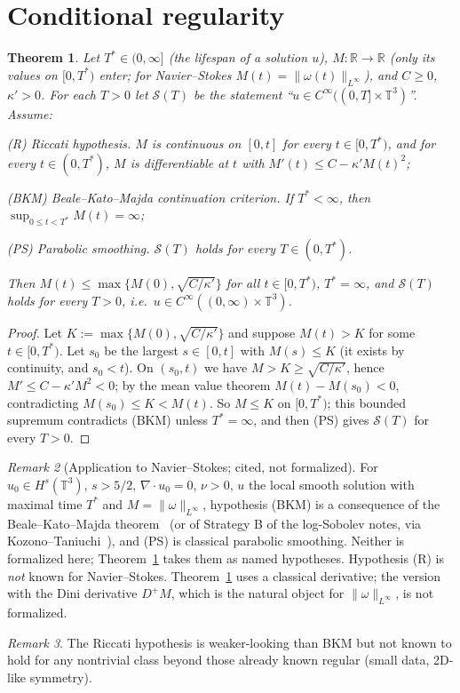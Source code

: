 \documentclass[11pt]{amsart}
\newtheorem{theorem}{Theorem}[section]
\theoremstyle{definition}\newtheorem{definition}[theorem]{Definition}
\theoremstyle{remark}\newtheorem{remark}[theorem]{Remark}
\newcommand{\T}{\mathbb{T}^3}
\begin{document}
\section{Conditional regularity}
\begin{theorem}\label{thm:cond}
Let $T^*\in(0,\infty]$ (the lifespan of a solution $u$), $M\colon\mathbb R\to\mathbb R$ (only its values on $[0,T^*)$ enter; for
Navier--Stokes $M(t)=\|\omega(t)\|_{L^\infty}$), and $C\ge0$, $\kappa'>0$. For each $T>0$ let $\mathcal S(T)$ be the statement
``$u\in C^\infty((0,T]\times\T)$''. Assume:
\par\noindent(R) \emph{Riccati hypothesis.} $M$ is continuous on $[0,t]$ for every $t\in[0,T^*)$, and for every $t\in(0,T^*)$, $M$ is differentiable at $t$ with $M'(t)\le C-\kappa'M(t)^2$;
\par\noindent(BKM) \emph{Beale--Kato--Majda continuation criterion.} If $T^*<\infty$, then $\sup_{0\le t<T^*}M(t)=\infty$;
\par\noindent(PS) \emph{Parabolic smoothing.} $\mathcal S(T)$ holds for every $T\in(0,T^*)$.
\par\noindent
Then $M(t)\le\max\{M(0),\sqrt{C/\kappa'}\}$ for all $t\in[0,T^*)$, $T^*=\infty$, and $\mathcal S(T)$ holds for every $T>0$, i.e.\ $u\in C^\infty((0,\infty)\times\T)$.
\end{theorem}
\begin{proof}Let $K:=\max\{M(0),\sqrt{C/\kappa'}\}$ and suppose $M(t)>K$ for some $t\in[0,T^*)$. Let $s_0$ be the largest
$s\in[0,t]$ with $M(s)\le K$ (it exists by continuity, and $s_0<t$). On $(s_0,t)$ we have $M>K\ge\sqrt{C/\kappa'}$, hence
$M'\le C-\kappa'M^2<0$; by the mean value theorem $M(t)-M(s_0)<0$, contradicting $M(s_0)\le K<M(t)$. So $M\le K$ on $[0,T^*)$;
this bounded supremum contradicts (BKM) unless $T^*=\infty$, and then (PS) gives $\mathcal S(T)$ for every $T>0$.\end{proof}
\begin{remark}[Application to Navier--Stokes; cited, not formalized]
For $u_0\in H^s(\T)$, $s>5/2$, $\nabla\cdot u_0=0$, $\nu>0$, $u$ the local smooth solution with maximal time $T^*$ and
$M=\|\omega\|_{L^\infty}$, hypothesis (BKM) is a consequence of the Beale--Kato--Majda theorem~\cite{BKM1984} (or of Strategy B of the
log-Sobolev notes, via Kozono--Taniuchi~\cite{KozonoTaniuchi}), and (PS) is classical parabolic smoothing. Neither is formalized here;
Theorem~\ref{thm:cond} takes them as named hypotheses. Hypothesis (R) is \emph{not} known for Navier--Stokes. Theorem~\ref{thm:cond} uses
a classical derivative; the version with the Dini derivative $D^+M$, which is the natural object for $\|\omega\|_{L^\infty}$, is not formalized.
\end{remark}
\begin{remark}The Riccati hypothesis is weaker-looking than BKM but not known to hold for any nontrivial class beyond those already known regular (small data, 2D-like symmetry).\end{remark}
\end{document}
